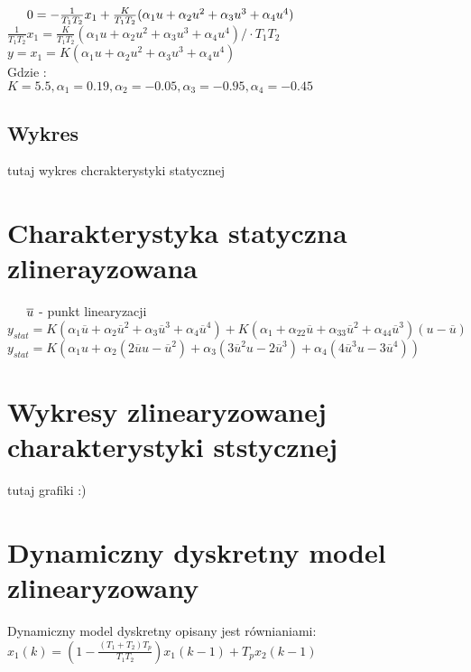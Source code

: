 \documentclass[a4paper, 11pt]{article}
\begin{document}
$\indent0 = -\frac{1}{T_{1}T_{2}}x_1 + \frac{K}{T_{1}T_{2}}(\alpha_1u + \alpha_2u^2 + \alpha_3u^3 + \alpha_4u^4)$
\\

$\frac{1}{T_{1}T_{2}}x_1 =  \frac{K}{T_{1}T_{2}}(\alpha_1u + \alpha_2u^2 + \alpha_3u^3 + \alpha_4u^4)/\cdot T_1T_2$
\\

$y = x_1 = K(\alpha_1u + \alpha_2u^2 + \alpha_3u^3 + \alpha_4u^4)$\\

Gdzie : \\

$K  = 5.5,\alpha_1 = 0.19, \alpha_2 = -0.05, \alpha_3 = -0.95, \alpha_4 = -0.45$
\subsection{Wykres}
tutaj wykres chcrakterystyki statycznej

\section{Charakterystyka statyczna zlinerayzowana}

$\indent \overline{u}$ - punkt linearyzacji 
\\

$y_{stat} = K(\alpha_1\overline{u} + \alpha_2\overline{u}^2 + \alpha_3\overline{u}^3 + \alpha_4\overline{u}^4)
+ K(\alpha_1 + \alpha_22\overline{u} + \alpha_33\overline{u}^2 + \alpha_44\overline{u}^3)(u-\overline{u})$
\\

$y_{stat} = K(\alpha_1u + \alpha_2(2\overline{u}u - \overline{u}^2)+ \alpha_3(3\overline{u}^2u-2\overline{u}^3) + \alpha_4(4\overline{u}^3u - 3\overline{u}^4))$

\section{Wykresy zlinearyzowanej charakterystyki ststycznej}
tutaj grafiki :) 

\section{Dynamiczny dyskretny model zlinearyzowany}
Dynamiczny model dyskretny opisany jest równianiami:
\\

$x_1(k) =(1-\frac{(T_1 + T_2)T_p}{T_1T_2})x_1(k-1)+T_px_2(k-1) $
\\
\end{document}
